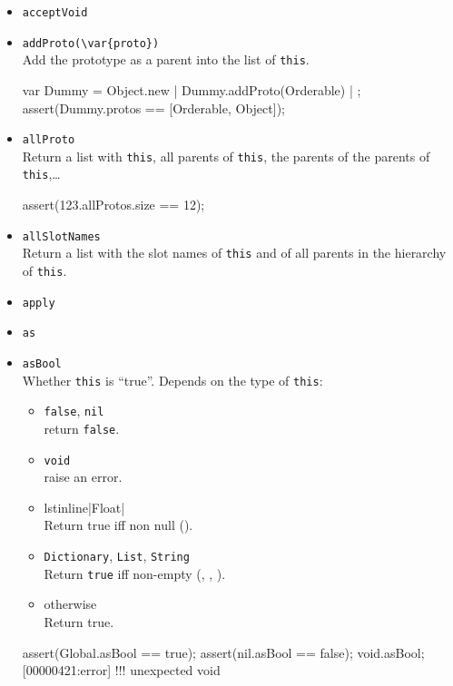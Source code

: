 \begin{itemize}
\item \lstinline|acceptVoid|\\

\item \lstinline|addProto(\var{proto})|\\
  Add the prototype  as a parent into the list of
  \lstinline|this|.

\begin{urbiscript}
var Dummy = Object.new | Dummy.addProto(Orderable) | {};
assert(Dummy.protos == [Orderable, Object]);
\end{urbiscript}

\item \lstinline|allProto|\\
  Return a list with \lstinline|this|, all parents of
  \lstinline|this|, the parents of the parents of
  \lstinline|this|,\ldots
\begin{urbiscript}[firstnumber=last]
assert(123.allProtos.size == 12);
\end{urbiscript}

\item \lstinline|allSlotNames|\\
  Return a list with the slot names of \lstinline|this| and of all
  parents in the hierarchy of \lstinline|this|.

\item \lstinline|apply|\\

\item \lstinline|as|\\

\item \lstinline|asBool|\\
  Whether \lstinline|this| is ``true''.  Depends on the type of
  \lstinline|this|:
  \begin{itemize}
  \item \lstinline|false|, \lstinline|nil|\\
    return \lstinline|false|.
  \item  \lstinline|void|\\
    raise an error.
  \item lstinline|Float|\\
    Return true iff non null ().
  \item \lstinline|Dictionary|, \lstinline|List|,  \lstinline|String|\\
    Return \lstinline|true| iff non-empty (,
    , ).
  \item otherwise\\
    Return true.
  \end{itemize}
\begin{urbiscript}[firstnumber=last]
assert(Global.asBool == true);
assert(nil.asBool ==    false);
void.asBool;
[00000421:error] !!! unexpected void
\end{urbiscript}


\end{itemize}
